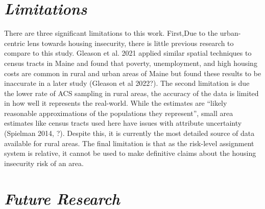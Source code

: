 \section{\textit{Limitations}}

There are three significant limitations to this work. First,Due to the urban-centric lens towards housing insecurity, there is little previous research to compare to this study. Gleason et al. 2021 applied similar spatial techniques to census tracts in Maine and found that poverty, unemployment, and high housing costs are common in rural and urban areas of Maine but found these results to be inaccurate in a later study (Gleason et al 2022?). The second limitation is due the lower rate of ACS sampling in rural areas, the accuracy of the data is limited in how well it represents the real-world. While the estimates are “likely reasonable approximations of the populations they represent”, small area estimates like census tracts used here have issues with attribute uncertainty (Spielman 2014, ?). Despite this, it is currently the most detailed source of data available for rural areas. The final limitation is that as the risk-level assignment system is relative, it cannot be used to make definitive claims about the housing insecurity risk of an area.  

\section{\textit{Future Research}}

